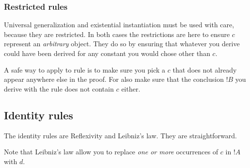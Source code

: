 \documentclass[../../../../include/open-logic-section]{subfiles}
\begin{document}
\subsubsection{Restricted rules}

Universal generalization \Intro{\lforall} and existential instantiation
\Intro{\lexists} must be used with care, because they are restricted.
In both cases the restrictions are here to ensure $c$ 
represent an \emph{arbitrary} object. They do so by ensuring that 
whatever you derive could have been derived for any constant you 
would chose other than $c$. 

A safe way to apply to rule is to make sure you pick a $c$ that 
does not already appear anywhere else in the proof. For \Elim{\lforall} 
also make sure that the conclusion $!B$ you derive with the rule does 
not contain $c$ either.

\subsection{Identity rules}

The identity rules are Reflexivity and Leibniz's law. They are 
straightforward.

Note that Leibniz's law allow you to replace \emph{one or more} 
occurrences of $c$ in $!A$ with $d$.
\end{document}
